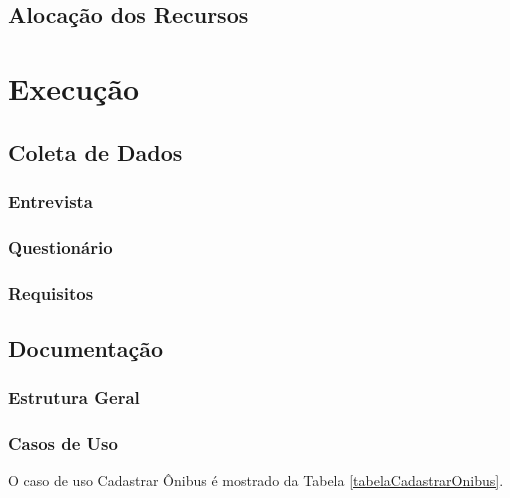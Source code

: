 \documentclass[openright]{ifrs} %
\begin{document}
\subsection{Alocação dos Recursos}
\section{Execução}
\subsection{Coleta de Dados}
\subsubsection{Entrevista}
\subsubsection{Questionário}
\subsubsection{Requisitos}
\subsection{Documentação}
\subsubsection{Estrutura Geral}
\subsubsection{Casos de Uso}
O caso de uso Cadastrar Ônibus é mostrado da Tabela \ref{tabelaCadastrarOnibus}.
\end{document}

